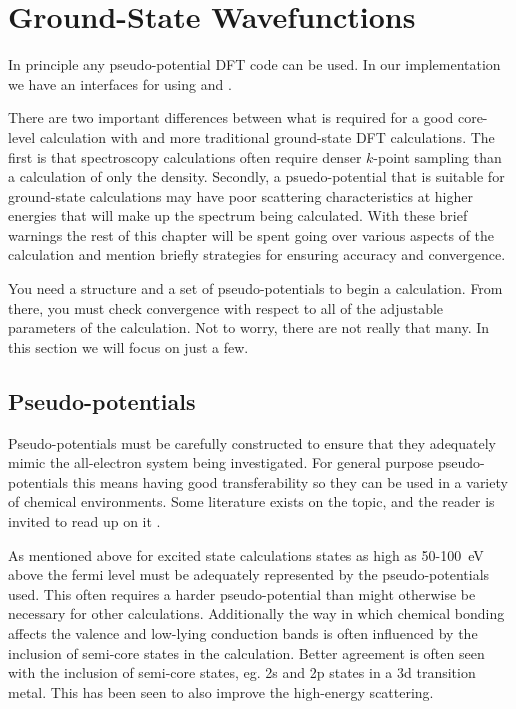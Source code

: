 \documentclass[11pt]{report}
\begin{document}
\chapter{Ground-State Wavefunctions}
\label{ground_state}
In principle any pseudo-potential DFT code can be used. In our implementation we have an interfaces for using 
 \cite{abinit0,abinit1,abinit2,abinit3} and  \cite{espresso1,espresso2}. 

There are two important differences between what is required for a good core-level calculation with  and more traditional ground-state DFT calculations. The first is that spectroscopy calculations often require denser $k$-point sampling than a calculation of only the density. Secondly, a psuedo-potential that is suitable for ground-state calculations may have poor scattering characteristics at higher energies that will make up the spectrum being calculated. With these brief warnings the rest of this chapter will be spent going over various aspects of the calculation and mention briefly strategies for ensuring accuracy and convergence.

You need a structure and a set of pseudo-potentials to begin a calculation. From there, you must check convergence with respect to all of the adjustable parameters of the calculation. Not to worry, there are not really that many. In this section we will focus on just a few.

\section{Pseudo-potentials}

Pseudo-potentials must be carefully constructed to ensure that they adequately mimic the all-electron system being investigated. For general purpose pseudo-potentials this means having good transferability so they can be used in a variety of chemical environments. Some literature exists on the topic, and the reader is invited to read up on it\cite{Psp} .

As mentioned above for excited state calculations states as high as 50-100~eV above the fermi level must be adequately represented by the pseudo-potentials used. This often requires a harder pseudo-potential than might otherwise be necessary for 
other calculations. Additionally the way in which chemical bonding affects the valence and low-lying conduction bands is often influenced by the inclusion of semi-core states in the calculation. Better agreement is often seen with the inclusion of semi-core states, eg. 2s and 2p states in a 3d transition metal. This has been seen to also improve the high-energy scattering.\cite{}
\end{document}
